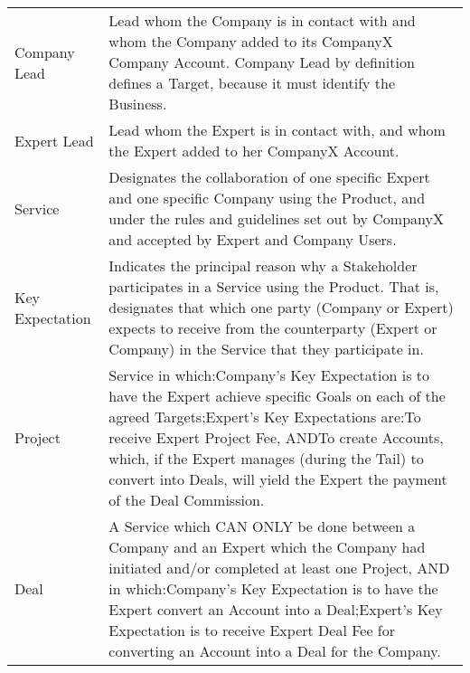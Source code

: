 \begin{longtable}{lp{7.5cm}}
Company Lead               & Lead whom the Company is in contact with and whom the Company added to its CompanyX Company Account. Company Lead by definition defines a Target, because it must identify the Business.                                                                                                                                                                                  \\
Expert Lead                & Lead whom the Expert is in contact with, and whom the Expert added to her CompanyX Account.                                                                                                                                                                                                                                                                               \\
Service                    & Designates the collaboration of one specific Expert and one specific Company using the Product, and under the rules and guidelines set out by CompanyX and accepted by Expert and Company Users.                                                                                                                                                                          \\
Key Expectation            & Indicates the principal reason why a Stakeholder participates in a Service using the Product. That is, designates that which one party (Company or Expert) expects to receive from the counterparty (Expert or Company) in the Service that they participate in.                                                                                                          \\
Project                    & Service in which:Company’s Key Expectation is to have the Expert achieve specific Goals on each of the agreed Targets;Expert’s Key Expectations are:To receive Expert Project Fee, ANDTo create Accounts, which, if the Expert manages (during the Tail) to convert into Deals, will yield the Expert the payment of the Deal Commission.                                 \\
Deal                       & A Service which CAN ONLY be done between a Company and an Expert which the Company had initiated and/or completed at least one Project, AND in which:Company’s Key Expectation is to have the Expert convert an Account into a Deal;Expert’s Key Expectation is to receive Expert Deal Fee for converting an Account into a Deal for the Company.                         \\

\end{longtable}

